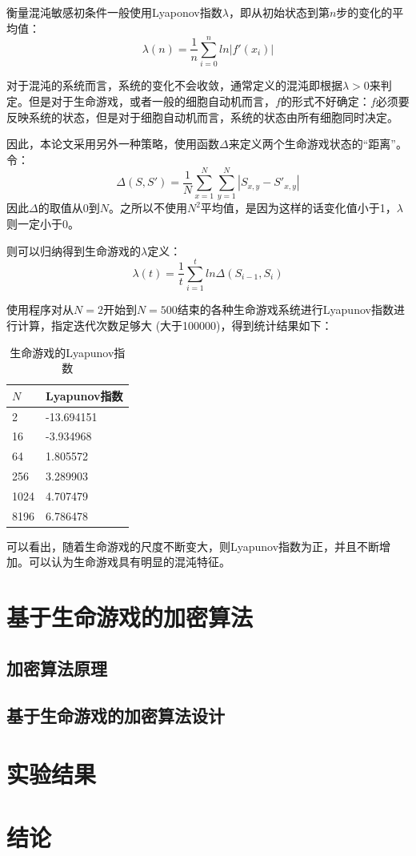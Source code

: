 \documentclass[a4paper,12pt]{report}
\begin{document}
衡量混沌敏感初条件一般使用Lyaponov指数$\lambda$，即从初始状态到第$n$步的变化的平均值：
\begin{equation}
\lambda(n) = \frac{1}{n}\sum_{i = 0}^{n} ln|f'(x_i)|
\end{equation}

对于混沌的系统而言，系统的变化不会收敛，通常定义的混沌即根据$\lambda > 0$来判定。但是对于生命游戏，或者一般的细胞自动机而言，$f$的形式不好确定：$f$必须要反映系统的状态，但是对于细胞自动机而言，系统的状态由所有细胞同时决定。

因此，本论文采用另外一种策略，使用函数$\Delta$来定义两个生命游戏状态的“距离”。令：
\begin{equation}
\Delta(S,S') = \frac{1}{N} \sum_{x=1}^{N}\sum_{y=1}^{N} |S_{x,y}-S'_{x,y}|
\end{equation}
因此$\Delta$的取值从0到$N$。之所以不使用$N^2$平均值，是因为这样的话变化值小于1，$\lambda$则一定小于0。

则可以归纳得到生命游戏的$\lambda$定义：
\begin{equation}\label{eq:lyapunov}
\lambda(t) = \frac{1}{t} \sum_{i=1}^{t} ln\Delta(S_{i-1},S_i)
\end{equation}

使用程序对从$N=2$开始到$N=500$结束的各种生命游戏系统进行Lyapunov指数进行计算，指定迭代次数足够大 (大于100000)，得到统计结果如下：

\begin{table}[!ht]
\centering
\begin{tabular}{|l|l|}
\hline
$N$   & Lyapunov指数 \\ \hline
2     & -13.694151 \\ \hline
16    & -3.934968  \\ \hline
64    & 1.805572   \\ \hline
256   & 3.289903   \\ \hline
1024  & 4.707479   \\ \hline
8196  & 6.786478   \\ \hline
\end{tabular}
\label{table:lyapunov}
\caption{生命游戏的Lyapunov指数}
\end{table}

可以看出，随着生命游戏的尺度不断变大，则Lyapunov指数为正，并且不断增加。可以认为生命游戏具有明显的混沌特征。



\chapter{基于生命游戏的加密算法}

\section{加密算法原理}

\section{基于生命游戏的加密算法设计}

\chapter{实验结果}

\chapter{结论}

\printbibliography
\end{document}
